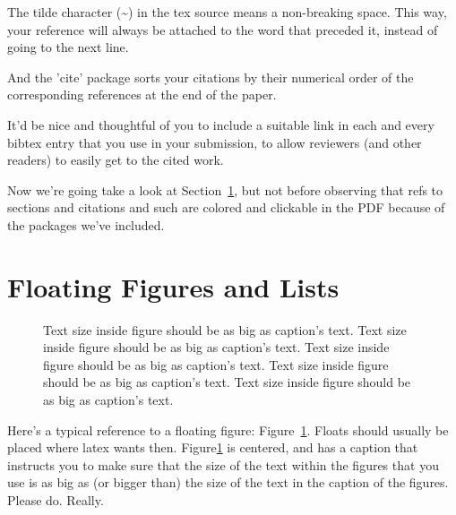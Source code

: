 The tilde character (\~{}) in the tex source means a non-breaking
space. This way, your reference will always be attached to the word
that preceded it, instead of going to the next line.

And the 'cite' package sorts your citations by their numerical order
of the corresponding references at the end of the paper.

It'd be nice and thoughtful of you to include a suitable link in each
and every bibtex entry that you use in your submission, to allow
reviewers (and other readers) to easily get to the cited work.

Now we're going take a look at Section~\ref{sec:figs}, but not before
observing that refs to sections and citations and such are colored and
clickable in the PDF because of the packages we've included.

\section{Floating Figures and Lists}
\label{sec:figs}


\begin{figure}
\begin{center}
\end{center}
\caption{\label{fig:vectors} Text size inside figure should be as big as
  caption's text. Text size inside figure should be as big as
  caption's text. Text size inside figure should be as big as
  caption's text. Text size inside figure should be as big as
  caption's text. Text size inside figure should be as big as
  caption's text. }
\end{figure}


Here's a typical reference to a floating figure:
Figure~\ref{fig:vectors}. Floats should usually be placed where latex
wants then. Figure\ref{fig:vectors} is centered, and has a caption
that instructs you to make sure that the size of the text within the
figures that you use is as big as (or bigger than) the size of the
text in the caption of the figures. Please do. Really.

